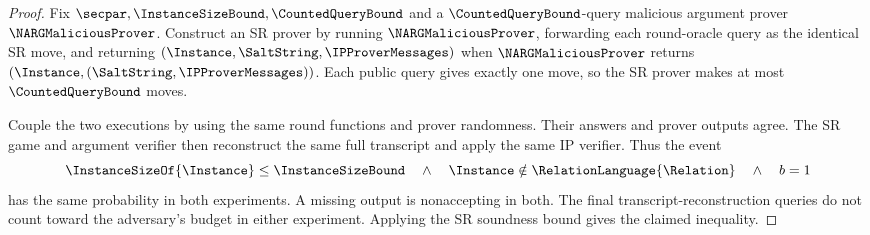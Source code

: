 \begin{proof}
Fix \(\secpar,\InstanceSizeBound,\CountedQueryBound\) and a \(\CountedQueryBound\)-query malicious argument prover \(\NARGMaliciousProver\). Construct an SR prover by running \(\NARGMaliciousProver\), forwarding each round-oracle query as the identical SR move, and returning \((\Instance,\SaltString,\IPProverMessages)\) when \(\NARGMaliciousProver\) returns \((\Instance,(\SaltString,\IPProverMessages))\). Each public query gives exactly one move, so the SR prover makes at most \(\CountedQueryBound\) moves.

Couple the two executions by using the same round functions and prover randomness. Their answers and prover outputs agree. The SR game and argument verifier then reconstruct the same full transcript and apply the same IP verifier. Thus the event
\begin{equation*}
  \InstanceSizeOf{\Instance}\le\InstanceSizeBound
  \quad\land\quad\Instance\notin\RelationLanguage{\Relation}
  \quad\land\quad b=1
\end{equation*}
has the same probability in both experiments. A missing output is nonaccepting in both. The final transcript-reconstruction queries do not count toward the adversary's budget in either experiment. Applying the SR soundness bound gives the claimed inequality.
\leanok
\end{proof}

